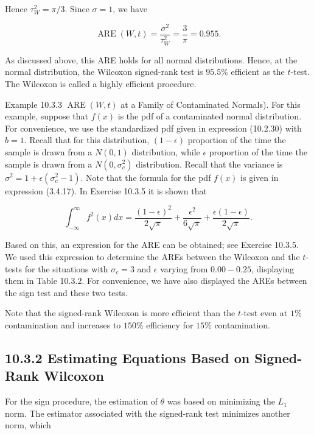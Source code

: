Hence $\tau_{W}^{2}=\pi / 3$. Since $\sigma=1$, we have


\begin{equation*}
\operatorname{ARE}(W, t)=\frac{\sigma^{2}}{\tau_{W}^{2}}=\frac{3}{\pi}=0.955 . \tag{10.3.29}
\end{equation*}


As discussed above, this ARE holds for all normal distributions. Hence, at the normal distribution, the Wilcoxon signed-rank test is $95.5 \%$ efficient as the $t$-test. The Wilcoxon is called a highly efficient procedure.

Example 10.3.3 $\operatorname{ARE}(W, t)$ at a Family of Contaminated Normals). For this example, suppose that $f(x)$ is the pdf of a contaminated normal distribution. For convenience, we use the standardized pdf given in expression (10.2.30) with $b=1$. Recall that for this distribution, $(1-\epsilon)$ proportion of the time the sample is drawn from a $N(0,1)$ distribution, while $\epsilon$ proportion of the time the sample is drawn from a $N\left(0, \sigma_{c}^{2}\right)$ distribution. Recall that the variance is $\sigma^{2}=1+\epsilon\left(\sigma_{c}^{2}-1\right)$. Note that the formula for the pdf $f(x)$ is given in expression (3.4.17). In Exercise 10.3.5 it is shown that


\begin{equation*}
\int_{-\infty}^{\infty} f^{2}(x) d x=\frac{(1-\epsilon)^{2}}{2 \sqrt{\pi}}+\frac{\epsilon^{2}}{6 \sqrt{\pi}}+\frac{\epsilon(1-\epsilon)}{2 \sqrt{\pi}} . \tag{10.3.30}
\end{equation*}


Based on this, an expression for the ARE can be obtained; see Exercise 10.3.5. We used this expression to determine the AREs between the Wilcoxon and the $t$-tests for the situations with $\sigma_{c}=3$ and $\epsilon$ varying from $0.00-0.25$, displaying them in Table 10.3.2. For convenience, we have also displayed the AREs between the sign test and these two tests.

Note that the signed-rank Wilcoxon is more efficient than the $t$-test even at $1 \%$ contamination and increases to $150 \%$ efficiency for $15 \%$ contamination.

\subsection*{10.3.2 Estimating Equations Based on Signed-Rank Wilcoxon}
For the sign procedure, the estimation of $\theta$ was based on minimizing the $L_{1}$ norm. The estimator associated with the signed-rank test minimizes another norm, which

